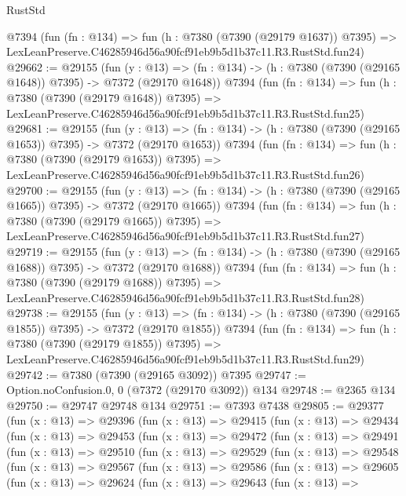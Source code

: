 \begin{lexlean}{RustStd}
\begin{coremodule}
    @7394
    (fun (fn : @134) =>
    fun (h : @7380 (@7390 (@29179 @1637)) @7395) =>
    LexLeanPreserve.C46285946d56a90fcf91eb9b5d1b37c11.R3.RustStd.fun24)
@29662 := @29155
    (fun (y : @13) =>
    (fn : @134) -> (h : @7380 (@7390 (@29165 @1648)) @7395) -> @7372 (@29170 @1648))
    @7394
    (fun (fn : @134) =>
    fun (h : @7380 (@7390 (@29179 @1648)) @7395) =>
    LexLeanPreserve.C46285946d56a90fcf91eb9b5d1b37c11.R3.RustStd.fun25)
@29681 := @29155
    (fun (y : @13) =>
    (fn : @134) -> (h : @7380 (@7390 (@29165 @1653)) @7395) -> @7372 (@29170 @1653))
    @7394
    (fun (fn : @134) =>
    fun (h : @7380 (@7390 (@29179 @1653)) @7395) =>
    LexLeanPreserve.C46285946d56a90fcf91eb9b5d1b37c11.R3.RustStd.fun26)
@29700 := @29155
    (fun (y : @13) =>
    (fn : @134) -> (h : @7380 (@7390 (@29165 @1665)) @7395) -> @7372 (@29170 @1665))
    @7394
    (fun (fn : @134) =>
    fun (h : @7380 (@7390 (@29179 @1665)) @7395) =>
    LexLeanPreserve.C46285946d56a90fcf91eb9b5d1b37c11.R3.RustStd.fun27)
@29719 := @29155
    (fun (y : @13) =>
    (fn : @134) -> (h : @7380 (@7390 (@29165 @1688)) @7395) -> @7372 (@29170 @1688))
    @7394
    (fun (fn : @134) =>
    fun (h : @7380 (@7390 (@29179 @1688)) @7395) =>
    LexLeanPreserve.C46285946d56a90fcf91eb9b5d1b37c11.R3.RustStd.fun28)
@29738 := @29155
    (fun (y : @13) =>
    (fn : @134) -> (h : @7380 (@7390 (@29165 @1855)) @7395) -> @7372 (@29170 @1855))
    @7394
    (fun (fn : @134) =>
    fun (h : @7380 (@7390 (@29179 @1855)) @7395) =>
    LexLeanPreserve.C46285946d56a90fcf91eb9b5d1b37c11.R3.RustStd.fun29)
@29742 := @7380 (@7390 (@29165 @3092)) @7395
@29747 := Option.noConfusion.{0, 0} (@7372 (@29170 @3092)) @134
@29748 := @2365 @134
@29750 := @29747 @29748 @134
@29751 := @7393 @7438
@29805 := @29377
    (fun (x : @13) =>
    @29396
      (fun (x : @13) =>
      @29415
        (fun (x : @13) =>
        @29434
          (fun (x : @13) =>
          @29453
            (fun (x : @13) =>
            @29472
              (fun (x : @13) =>
              @29491
                (fun (x : @13) =>
                @29510
                  (fun (x : @13) =>
                  @29529
                    (fun (x : @13) =>
                    @29548
                      (fun (x : @13) =>
                      @29567
                        (fun (x : @13) =>
                        @29586
                          (fun (x : @13) =>
                          @29605
                            (fun (x : @13) =>
                            @29624
                              (fun (x : @13) =>
                              @29643
                                (fun (x : @13) =>

\end{coremodule}
\end{lexlean}
